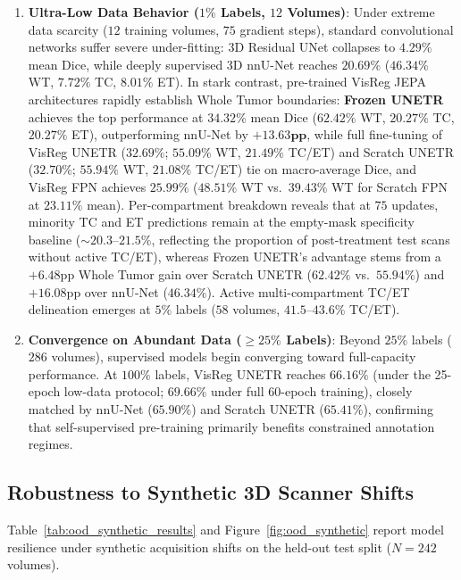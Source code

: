 \documentclass{article}
\begin{document}
\begin{enumerate}
    \item \textbf{Ultra-Low Data Behavior ($1\%$ Labels, $12$ Volumes)}: Under extreme data scarcity ($12$ training volumes, $75$ gradient steps), standard convolutional networks suffer severe under-fitting: 3D Residual UNet collapses to $4.29\%$ mean Dice, while deeply supervised 3D nnU-Net reaches $20.69\%$ ($46.34\%$ WT, $7.72\%$ TC, $8.01\%$ ET). In stark contrast, pre-trained VisReg JEPA architectures rapidly establish Whole Tumor boundaries: \textbf{Frozen UNETR} achieves the top performance at $\mathbf{34.32\%}$ mean Dice ($62.42\%$ WT, $20.27\%$ TC, $20.27\%$ ET), outperforming nnU-Net by $\mathbf{+13.63\text{pp}}$, while full fine-tuning of VisReg UNETR ($32.69\%$; $55.09\%$ WT, $21.49\%$ TC/ET) and Scratch UNETR ($32.70\%$; $55.94\%$ WT, $21.08\%$ TC/ET) tie on macro-average Dice, and VisReg FPN achieves $25.99\%$ ($48.51\%$ WT vs.\ $39.43\%$ WT for Scratch FPN at $23.11\%$ mean). Per-compartment breakdown reveals that at $75$ updates, minority TC and ET predictions remain at the empty-mask specificity baseline ($\sim 20.3\text{--}21.5\%$, reflecting the proportion of post-treatment test scans without active TC/ET), whereas Frozen UNETR's advantage stems from a $+6.48\text{pp}$ Whole Tumor gain over Scratch UNETR ($62.42\%$ vs.\ $55.94\%$) and $+16.08\text{pp}$ over nnU-Net ($46.34\%$). Active multi-compartment TC/ET delineation emerges at $5\%$ labels ($58$ volumes, $41.5\text{--}43.6\%$ TC/ET).
    \item \textbf{Convergence on Abundant Data ($\ge 25\%$ Labels)}: Beyond $25\%$ labels ($286$ volumes), supervised models begin converging toward full-capacity performance. At $100\%$ labels, VisReg UNETR reaches $66.16\%$ (under the 25-epoch low-data protocol; $69.66\%$ under full 60-epoch training), closely matched by nnU-Net ($65.90\%$) and Scratch UNETR ($65.41\%$), confirming that self-supervised pre-training primarily benefits constrained annotation regimes.
\end{enumerate}

\subsection{Robustness to Synthetic 3D Scanner Shifts}
\label{sec:results_ood_synthetic}

Table~\ref{tab:ood_synthetic_results} and Figure~\ref{fig:ood_synthetic} report model resilience under synthetic acquisition shifts on the held-out test split ($N=242$ volumes).
\end{document}
